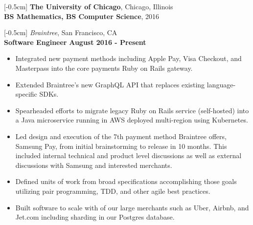 \documentclass[9pt]{res} %
\begin{document}

\address{
    178 Church Street\\  
    San Francisco, CA 94114 \\   
    \href{mailto:kira.ghandhi@gmail.com}{kira.ghandhi@gmail.com}  $\bullet$ (650)743-8198 $\bullet$ \url{https://github.com/kghandhi} \\
}

\begin{resume}                         
[-0.5cm]  
\textbf{\color{Maroon}The University of Chicago}, Chicago, Illinois \\
\textbf{BS Mathematics, BS Computer Science}, 2016 \\
\vspace{-4pt}

[-0.5cm]
\textit{\color{MidnightBlue}Braintree}, San Francisco, CA \\
\textbf{Software Engineer}
\hspace*{\fill} \textbf{August 2016 - Present}
\begin{itemize}
\item Integrated new payment methods including Apple Pay, Visa Checkout, and Masterpass into the core payments Ruby on Rails gateway.
\item Extended Braintree's new GraphQL API that replaces existing language-specific SDKs.
\item Spearheaded efforts to migrate legacy Ruby on Rails service (self-hosted) into a Java microservice running in AWS deployed multi-region using Kubernetes.
\item Led design and execution of the 7th payment method Braintree offers, Samsung Pay, from initial brainstorming to release in 10 months. This included internal technical and product level discussions as well as external discussions with Samsung and interested merchants.
\item Defined units of work from broad specifications accomplishing those goals utilizing pair programming, TDD, and other agile best practices.
\item Built software to scale with of our large merchants such as Uber, Airbnb, and Jet.com including sharding in our Postgres database.
\end{itemize}


\end{resume}
\end{document}
